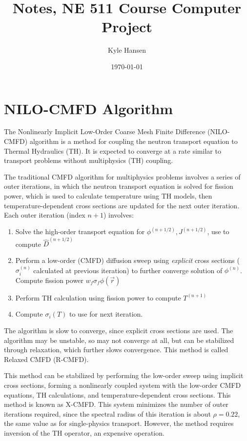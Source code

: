 \documentclass{notes-template}
\title{Notes, NE 511 Course Computer Project}
\author{Kyle Hansen}
\date{\today}
\begin{document}
\maketitle

\section{NILO-CMFD Algorithm}

The Nonlinearly Implicit Low-Order Coarse Mesh Finite Difference (NILO-CMFD) algorithm \cite{adamowicz2023nilo} is a method for coupling the neutron transport equation to Thermal Hydraulics (TH). It is expected to converge at a rate similar to transport problems without multiphysics (TH) coupling.

The traditional CMFD algorithm for multiphysics problems involves a series of outer iterations, in which the neutron transport equation is solved for fission power, which is used to calculate temperature using TH models, then temperature-dependent cross sections are updated for the next outer iteration. Each outer iteration (index $n+1$) involves:

\begin{enumerate}
    \item Solve the high-order transport equation for $\phi^{(n+1/2)}, J^{(n+1/2)}$, use to compute $\hat{D}^{(n+1/2)}$
    \item Perform a low-order (CMFD) diffusion sweep using \textit{explicit} cross sections ( $\sigma_i^{(n)}$ calculated at previous iteration) to further converge solution of $\phi^{(n)}$. Compute fission power $w_f\sigma_f\phi(\vec{r})$
    \item Perform TH calculation using fission power to compute $T^{(n+1)}$
    \item Compute $\sigma_i(T)$ to use for next iteration.
\end{enumerate}

The algorithm is slow to converge, since explicit cross sections are used. The algorithm may be unstable, so may not converge at all, but can be stabilized through relaxation, which further slows convergence. This method is called Relaxed CMFD (R-CMFD).

This method can be stabilized by performing the low-order sweep using implicit cross sections, forming a nonlinearly coupled system with the low-order CMFD equations, TH calculations, and temperature-dependent cross sections. This method is known as X-CMFD. This system minimizes the number of outer iterations required, since the spectral radius of this iteration is about $\rho=0.22$, the same value as for single-physics transport. However, the method requires inversion of the TH operator, an expensive operation.
\end{document}
